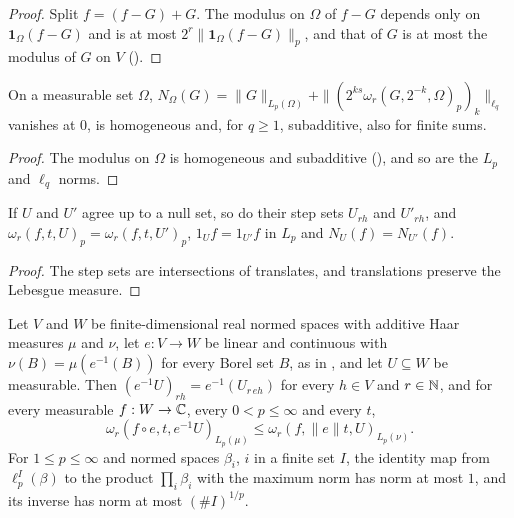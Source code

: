 \begin{proof}
\leanok
Split $f = (f - G) + G$. The modulus on $\Omega$ of $f - G$ depends only on
$\mathbf 1_\Omega (f - G)$ and is at most $2^r \|\mathbf 1_\Omega (f - G)\|_p$, and that of $G$ is
at most the modulus of $G$ on $V$ ().
\end{proof}

\begin{lemma}
\label{lem:modnorm-on}
\leanok
{}
On a measurable set $\Omega$, $N_\Omega(G) = \|G\|_{L_p(\Omega)} + \|(2^{ks} \omega_r(G, 2^{-k},
\Omega)_p)_k\|_{\ell_q}$ vanishes at $0$, is homogeneous and, for $q \geq 1$, subadditive, also
for finite sums.
\end{lemma}

\begin{proof}
\leanok
The modulus on $\Omega$ is homogeneous and subadditive (), and so are the
$L_p$ and $\ell_q$ norms.
\end{proof}

\begin{lemma}
\label{lem:null-set-domains}
\leanok
{}
If $U$ and $U'$ agree up to a null set, so do their step sets $U_{rh}$ and $U'_{rh}$, and
$\omega_r(f, t, U)_p = \omega_r(f, t, U')_p$, $1_U f = 1_{U'} f$ in $L_p$ and
$N_U(f) = N_{U'}(f)$.
\end{lemma}

\begin{proof}
\leanok
The step sets are intersections of translates, and translations preserve the Lebesgue measure.
\end{proof}

\begin{lemma}
\label{lem:modulus-on-linear-equiv}
\leanok
{}
Let $V$ and $W$ be finite-dimensional real normed spaces with additive Haar measures $\mu$ and
$\nu$, let $e : V \to W$ be linear and continuous with $\nu(B) = \mu(e^{-1}(B))$ for every Borel
set $B$, as in , and let $U \subseteq W$ be measurable. Then
$(e^{-1}U)_{rh} = e^{-1}(U_{r\,eh})$ for every $h \in V$ and
$r \in \mathbb{N}$, and for every measurable $f : W \to \mathbb{C}$, every $0 < p \leq \infty$ and every $t$,
\[
  \omega_r(f \circ e, t, e^{-1}U)_{L_p(\mu)} \leq \omega_r(f, \|e\| t, U)_{L_p(\nu)} .
\]
For $1 \leq p \leq \infty$ and normed spaces $\beta_i$, $i$ in a finite set $I$, the identity map
from $\ell_p^I(\beta)$ to the product $\prod_i \beta_i$ with the maximum norm has norm at most
$1$, and its inverse has norm at most $(\# I)^{1/p}$.
\end{lemma}

